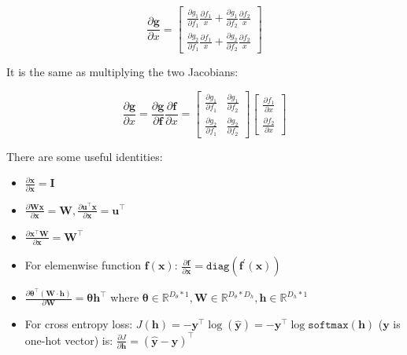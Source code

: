 \begin{equation}
	\frac{\partial \bm{g}}{\partial x} = \begin{bmatrix}
	\frac{\partial g_1}{\partial f_1} \frac{\partial f_1}{x} + \frac{\partial g_1}{\partial f_2} \frac{\partial f_2}{x}\\
	\frac{\partial g_2}{\partial f_1} \frac{\partial f_1}{x} + \frac{\partial g_2}{\partial f_2} \frac{\partial f_2}{x}
	\end{bmatrix}
\end{equation}


It is the same as multiplying the two Jacobians:

\begin{equation}
\frac{\partial \bm{g}}{\partial x} = \frac{\partial \bm{g}}{\partial \bm{f}} \frac{\partial \bm{f}}{\partial x} = \begin{bmatrix}
\frac{\partial g_1}{\partial f_1} & \frac{\partial g_1}{\partial f_2} \\
\frac{\partial g_2}{\partial f_1} & \frac{\partial g_2}{\partial f_2}
\end{bmatrix} \begin{bmatrix}
\frac{\partial f_1}{\partial x} \\
\frac{\partial f_2}{\partial x}
\end{bmatrix}
\end{equation}

There are some useful identities:

\begin{itemize}
	\item $\frac{\partial \bm{x}}{\partial \bm{x}} = \bm{I}$
	\item $\frac{\partial \bm{Wx}}{\partial \bm{x}} = \bm{W}, \frac{\partial \bm{u}^\top \bm{x}}{\partial \bm{x}} = \bm{u}^\top$
	\item $\frac{\partial \bm{x^\top W}}{\partial \bm{x}} = \bm{W^\top}$
	\item For elemenwise function $\bm{f}(\bm{x})$: $\frac{\partial \bm{f}}{\partial \bm{x}} = \texttt{diag}(\bm{f}^\prime(\bm{x}))$
	\item $\frac{\partial \bm{\theta}^\top (\bm{W} \cdot \bm{h})}{\partial \bm{W}} = \bm{\theta} \bm{h}^\top$ where $\bm{\theta} \in \mathbb{R}^{D_\theta * 1}, \bm{W} \in \mathbb{R}^{D_\theta * D_h}, \bm{h} \in \mathbb{R}^{D_h * 1}$
	\item For cross entropy loss: $J(\bm{h}) = - \bm{y}^\top \log (\hat{\bm{y}}) = - \bm{y}^\top \log \texttt{softmax}(\bm{h})$ ($\bm{y}$ is one-hot vector) is: $\frac{\partial J}{\partial \bm{h}} = (\hat{\bm{y}} - \bm{y})^\top$
\end{itemize}

